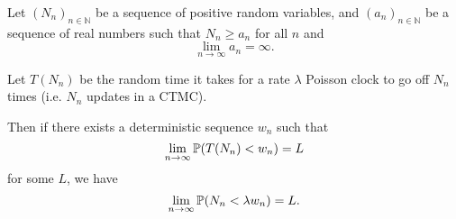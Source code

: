 	\begin{claim}[UNPROVEN]
	\label{claim:discrete vs continuous distributions}
		Let $(N_n)_{n \in \mathbb{N}}$ be a sequence of positive random variables, and $(a_n)_{n \in \mathbb{N}}$ be a sequence of real numbers such that $N_n \geq a_n$ for all $n$ and 
		\begin{equation}
			\lim_{n \rightarrow \infty} a_n = \infty.
		\end{equation}

		Let $T(N_n)$ be the random time it takes for a rate $\lambda$ Poisson clock to go off $N_n$ times (i.e. $N_n$ updates in a CTMC).

		Then if there exists a deterministic sequence $w_n$ such that
		\begin{equation}
			\lim_{n \rightarrow \infty} \mathbb{P}(T(N_n) < w_n) = L
		\end{equation}	
		for some $L$, we have
		\begin{equation}
			\lim_{n \rightarrow \infty} \mathbb{P}(N_n < \lambda w_n) = L.
		\end{equation}
		
	\end{claim}
